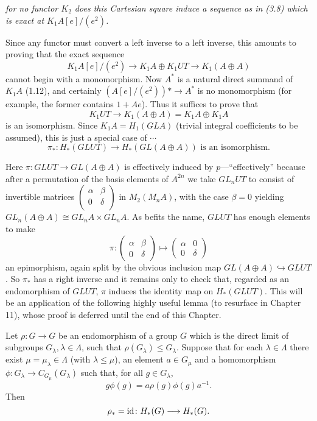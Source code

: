 {\em for no functor $K_2$ does this Cartesian square induce a sequence as in (3.8) which is exact at $K_1A[e]/(e^2)$.
}

Since any functor must convert a left inverse to a left inverse, this amounts to proving that the exact sequence
\[K_1 A[e]/(e^2) \longrightarrow K_1A\oplus K_1UT  \longrightarrow K_1(A \oplus A)\]
cannot begin with a monomorphism. Now $A^*$ is a natural direct summand of $K_1A$ (1.12), and certainly $(A[e] /(e^2))* \longrightarrow A^*$ is no monomorphism (for example, the former contains $1 + Ae$). Thus it suffices to prove that
\[K_1UT\longrightarrow K_1(A\oplus A) = K_1A\oplus K_1A\]
is an isomorphism. Since $K_1 A = H_1 (GLA)$ (trivial integral coefficients to be assumed), this is just a special case of $\cdots$
\begin{equation}
 \pi_*\colon   H_*(GLUT) \longrightarrow H_*(GL(A \oplus A)) \text{ is an isomorphism.}
\end{equation}
 
Here $\pi\colon   GLUT \longrightarrow GL( A \oplus A)$ is effectively induced by $p$---“effectively” because after a permutation of the basis elements of $A^{2n}$ we take $GL_nUT$ to consist of invertible matrices $\begin{pmatrix} \alpha & \beta \\0 &\delta\\  
\end{pmatrix}$ in $ M_2(M_nA)$, with the case $\beta = 0$ yielding $GL_n(A \oplus A)\cong GL_nA \times GL_nA$. As befits the name, $GLUT$ has enough elements to make
\[\pi\colon  \begin{pmatrix}
  \alpha & \beta \\0 &\delta
\end{pmatrix} \mapsto \begin{pmatrix}
  \alpha & 0 \\0 &\delta
\end{pmatrix}\]
an epimorphism, again split by the obvious inclusion map $GL(A \oplus  A) \hookrightarrow GLUT$. So $\pi_*$ has a right inverse and it remains only to check that, regarded as an endomorphism of $GLUT$, $\pi$ induces the identity map on $H_*(GLUT)$. This will be an application of the following highly useful lemma (to resurface in Chapter 11), whose proof is deferred until the end of this Chapter.
\begin{lemma}
  Let $\rho \colon   G \longrightarrow G$ be an endomorphism of a group $G$ which is the direct limit of subgroups $G_\lambda,\lambda \in \Lambda $, such that $\rho(G_\lambda) \leqslant G_\lambda$. Suppose that for each $\lambda \in \Lambda$ there exist $\mu=\mu_\lambda \in \Lambda$ (with $\lambda \leqslant \mu$), an element $a \in G_\mu$ and a homomorphism $\phi \colon   G_\lambda \longrightarrow C_{G_\mu} (G_\lambda)$ such that, 
for all $g\in G_\lambda$,
\[g\phi (g) = a\rho(g)\phi(g)a^{-1} .\]
Then
\[\rho_* = \mathrm{id} \colon   H_*(G) \longrightarrow H_*(G).\]
\end{lemma}

